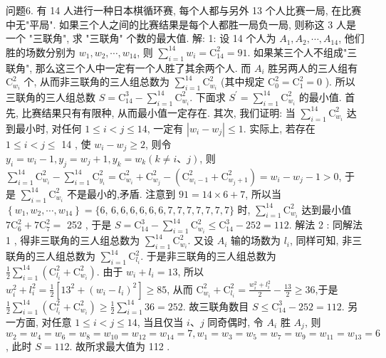 问题6. 有 14 人进行一种日本棋循环赛, 每个人都与另外 13 个人比赛一局, 在比赛中无"平局". 如果三个人之间的比赛结果是每个人都胜一局负一局, 则称这 3 人是一个 "三联角", 求 "三联角" 个数的最大值.
解: 1: 设 14 个人为 $A_1, A_2, \cdots, A_{14}$, 他们胜的场数分别为 $w_1,w_2, \cdots, w_{14}$, 则 $\sum_{i=1}^{14} w_i=\mathrm{C}_{14}^2=91$. 如果某三个人不组成"三联角", 那么这三个人中一定有一个人胜了其余两个人.
而 $A_i$ 胜另两人的三人组有 $\mathrm{C}_{w_i}^2$ 个, 从而非三联角的三人组总数为 $\sum_{i=1}^{14} \mathrm{C}_{w_i}^2$ (其中规定 $\mathrm{C}_0^2=\mathrm{C}_1^2=0$ ). 所以三联角的三人组总数 $S=\mathrm{C}_{14}^3-\sum_{i=1}^{14} \mathrm{C}_{w_i}^2$. 下面求 $S^{\prime}=\sum_{i=1}^{14} \mathrm{C}_{w_i}^2$ 的最小值.
首先, 比赛结果只有有限种, 从而最小值一定存在.
其次, 我们证明: 当 $\sum_{i=1}^{14} \mathrm{C}_{w_i}^2$ 达到最小时, 对任何 $1 \leqslant i<j \leqslant 14$, 一定有 $\left|w_i-w_j\right| \leqslant 1$. 实际上, 若存在 $1 \leqslant i<j \leqslant$ 14 , 使 $w_i-w_j \geqslant 2$, 则令 $y_i=w_i-1, y_j=w_j+1, y_k=w_k(k \neq i 、 j)$, 则 $\sum_{i=1}^{14} \mathrm{C}_{w_i}^2-\sum_{i=1}^{14} \mathrm{C}_{y_i}^2=\mathrm{C}_{w_i}^2+\mathrm{C}_{w_j}^2-\left(\mathrm{C}_{w_i-1}^2+\mathrm{C}_{w_j+1}^2\right)=w_i-w_j-1>0$, 于是 $\sum_{i=1}^{14} \mathrm{C}_{w_i}^2$ 不是最小的,矛盾.
注意到 $91=14 \times 6+7$, 所以当 $\left\{w_1, w_2, \cdots, w_{14}\right\}=\{6$, $6,6,6,6,6,6,7,7,7,7,7,7,7\}$ 时, $\sum_{i=1}^{14} \mathrm{C}_{w_i}^2$ 达到最小值 $7 \mathrm{C}_6^2+7 \mathrm{C}_7^2=$ 252 , 于是 $S=\mathrm{C}_{14}^3-\sum_{i=1}^{14} \mathrm{C}_{w_i}^2 \leqslant \mathrm{C}_{14}^3-252=112$. 解法 2 : 同解法 1 , 得非三联角的三人组总数为 $\sum_{i=1}^{14} \mathrm{C}_{w_i}^2$. 又设 $A_i$ 输的场数为 $l_i$, 同样可知, 非三联角的三人组总数为 $\sum_{i=1}^{14} \mathrm{C}_{l_i}^2$. 于是非三联角的三人组总数为 $\frac{1}{2} \sum_{i=1}^{14}\left(\mathrm{C}_{l_i}^2+\mathrm{C}_{w_i}^2\right)$. 由于 $w_i+ l_i=13$, 所以 $w_i^2+l_i^2=\frac{1}{2}\left[13^2+\left(w_i-l_i\right)^2\right] \geqslant 85$, 从而 $\mathrm{C}_{w_i}^2+\mathrm{C}_{l_i}^2=\frac{w_i^2+l_i^2}{2} -\frac{13}{2} \geqslant 36$,于是 $\frac{1}{2} \sum_{i=1}^{14}\left(\mathrm{C}_{l_i}^2+\mathrm{C}_{w_i}^2\right) \geqslant \frac{1}{2} \sum_{i=1}^{14} 36=252$. 故三联角数目 $S \leqslant \mathrm{C}_{14}^3 -252=112$. 另一方面, 对任意 $1 \leqslant i<j \leqslant 14$, 当且仅当 $i 、 j$ 同奇偶时, 令 $A_i$ 胜 $A_j$, 则 $w_2=w_4=w_6=w_8=w_{10}=w_{12}=w_{14}=7, w_1=w_3=w_5=w_7 =w_9=w_{11}=w_{13}=6$, 此时 $S=112$. 故所求最大值为 112 .


